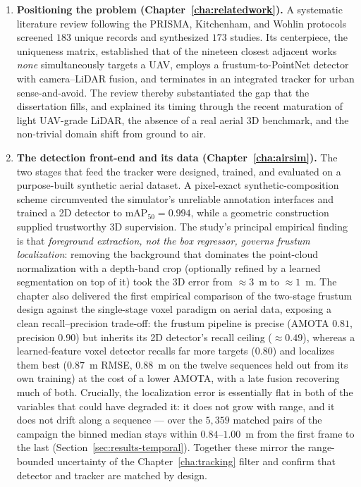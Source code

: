 \begin{enumerate}
  \item \textbf{Positioning the problem (Chapter~\ref{cha:relatedwork}).}
  A systematic literature review following the PRISMA, Kitchenham, and Wohlin
  protocols screened $183$ unique records and synthesized $173$ studies. Its
  centerpiece, the uniqueness matrix, established that of the nineteen closest
  adjacent works \emph{none} simultaneously targets a UAV, employs a
  frustum-to-PointNet detector with camera--LiDAR fusion, and terminates in an
  integrated tracker for urban sense-and-avoid. The review thereby substantiated
  the gap that the dissertation fills, and explained
  its timing through the recent maturation of light UAV-grade LiDAR, the absence of
  a real aerial 3D benchmark, and the non-trivial domain shift from ground to air.

  \item \textbf{The detection front-end and its data (Chapter~\ref{cha:airsim}).}
  The two stages that feed the tracker were designed, trained, and evaluated on a
  purpose-built synthetic aerial dataset. A pixel-exact synthetic-composition
  scheme circumvented the simulator's unreliable annotation interfaces and trained
  a 2D detector to $\mathrm{mAP}_{50}=0.994$, while a geometric construction
  supplied trustworthy 3D supervision. The study's principal empirical finding is
  that \emph{foreground extraction, not the box regressor, governs frustum
  localization}: removing the background that dominates the point-cloud
  normalization with a depth-band crop (optionally refined by a learned
  segmentation on top of it) took the 3D error from ${\approx}3$~m to
  ${\approx}1$~m. The chapter also delivered the
  first empirical comparison of the two-stage frustum design against the
  single-stage voxel paradigm on aerial data, exposing a clean recall--precision
  trade-off: the frustum pipeline is precise (AMOTA $0.81$, precision $0.90$) but
  inherits its 2D detector's recall ceiling (${\approx}0.49$), whereas a
  learned-feature voxel detector recalls far more targets ($0.80$) and localizes
  them best ($0.87$~m RMSE, $0.88$~m on the twelve sequences held out from its own
  training) at the cost of a lower AMOTA, with a late fusion
  recovering much of both. Crucially, the localization error is essentially flat in
  both of the variables that could have degraded it: it does not grow with range,
  and it does not drift along a sequence --- over the $5{,}359$ matched pairs of
  the campaign the binned median stays within $0.84$--$1.00$~m from the first
  frame to the last (Section~\ref{sec:results-temporal}). Together these mirror
  the range-bounded uncertainty of the Chapter~\ref{cha:tracking} filter and
  confirm that detector and tracker are matched by design.


\end{enumerate}
